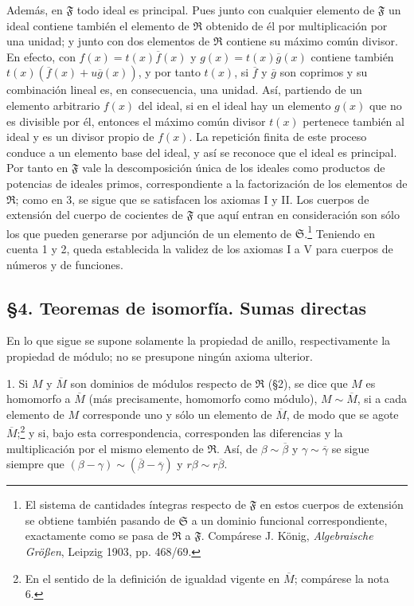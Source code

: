 \documentclass[11pt]{article}
\providecommand{\mR}{\mathfrak{R}}
\providecommand{\mS}{\mathfrak{S}}
\providecommand{\mF}{\mathfrak{F}}
\begin{document}
Además, en $\mF$ todo ideal es principal. Pues junto con cualquier elemento de $\mF$ un ideal contiene también el elemento de $\mR$ obtenido de él por multiplicación por una unidad; y junto con dos elementos de $\mR$ contiene su máximo común divisor. En efecto, con $f(x)=t(x)\overline f(x)$ y $g(x)=t(x)\overline g(x)$ contiene también $t(x)(\overline f(x)+u\overline g(x))$, y por tanto $t(x)$, si $\overline f$ y $\overline g$ son coprimos y su combinación lineal es, en consecuencia, una unidad. Así, partiendo de un elemento arbitrario $f(x)$ del ideal, si en el ideal hay un elemento $g(x)$ que no es divisible por él, entonces el máximo común divisor $t(x)$ pertenece también al ideal y es un divisor propio de $f(x)$. La repetición finita de este proceso conduce a un elemento base del ideal, y así se reconoce que el ideal es principal. Por tanto en $\mF$ vale la descomposición única de los ideales como productos de potencias de ideales primos, correspondiente a la factorización de los elementos de $\mR$; como en 3, se sigue que se satisfacen los axiomas I y II. Los cuerpos de extensión del cuerpo de cocientes de $\mF$ que aquí entran en consideración son sólo los que pueden generarse por adjunción de un elemento de $\mS$.\footnote{El sistema de cantidades íntegras respecto de $\mF$ en estos cuerpos de extensión se obtiene también pasando de $\mS$ a un dominio funcional correspondiente, exactamente como se pasa de $\mR$ a $\mF$. Compárese J. König, \emph{Algebraische Größen}, Leipzig 1903, pp. 468/69.} Teniendo en cuenta 1 y 2, queda establecida la validez de los axiomas I a V para cuerpos de números y de funciones.

\subsection*{§4. Teoremas de isomorfía. Sumas directas}

En lo que sigue se supone solamente la propiedad de anillo, respectivamente la propiedad de módulo; no se presupone ningún axioma ulterior.

1. Si $M$ y $\overline M$ son dominios de módulos respecto de $\mR$ (§2), se dice que $M$ es homomorfo a $\overline M$ (más precisamente, homomorfo como módulo), $M\sim\overline M$, si a cada elemento de $M$ corresponde uno y sólo un elemento de $\overline M$, de modo que se agote $\overline M$;\footnote{En el sentido de la definición de igualdad vigente en $\overline M$; compárese la nota 6.} y si, bajo esta correspondencia, corresponden las diferencias y la multiplicación por el mismo elemento de $\mR$. Así, de $\beta\sim\overline\beta$ y $\gamma\sim\overline\gamma$ se sigue siempre que $(\beta-\gamma)\sim(\overline\beta-\overline\gamma)$ y $r\beta\sim r\overline\beta$.
\end{document}
